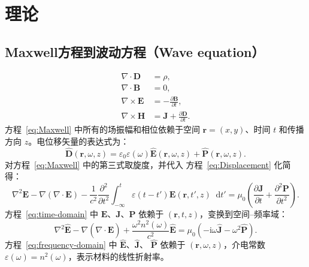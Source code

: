 \documentclass[a4paper,12pt]{ctexart}
\numberwithin{equation}{section}
\newcommand{\vect}[1]{\bm{#1}}
\newcommand{\dd}{\mathop{}\!\mathrm{d}}
\begin{document}
\section{理论}

\subsection{Maxwell方程到波动方程（Wave equation）}
\begin{equation}
  \begin{aligned}
    \nabla\cdot\vect{D}  & = \rho,                                         \\
    \nabla\cdot\vect{B}  & = 0,                                            \\
    \nabla\times\vect{E} & = -\frac{\partial\vect{B}}{\partial t},         \\
    \nabla\times\vect{H} & = \vect{J}+\frac{\partial\vect{D}}{\partial t}.
  \end{aligned}
  \label{eq:Maxwell}
\end{equation}
方程~\eqref{eq:Maxwell} 中所有的场振幅和相位依赖于空间
$\vect{r}=(x,y)$、时间 $t$ 和传播方向 $z$。电位移矢量的表达式为：
\begin{equation}
  \hat{\vect{D}}(\vect{r},\omega,z)
  =\varepsilon_0\varepsilon(\omega)\hat{\vect{E}}(\vect{r},\omega,z)
  +\hat{\vect{P}}(\vect{r},\omega,z).
  \label{eq:Displacement}
\end{equation}
对方程~\eqref{eq:Maxwell} 中的第三式取旋度，并代入
方程~\eqref{eq:Displacement} 化简得：
\begin{equation}
  \nabla^2\vect{E}-\nabla(\nabla\cdot\vect{E})
  -\frac{1}{c^2}\frac{\partial^2}{\partial t^2}
  \int_{-\infty}^{t}\varepsilon(t-t')\vect{E}(\vect{r},t',z)\dd t'
  =\mu_0\left(\frac{\partial\vect{J}}{\partial t}
  +\frac{\partial^2\vect{P}}{\partial t^2}\right).
  \label{eq:time-domain}
\end{equation}
方程~\eqref{eq:time-domain} 中 $\vect{E}$、$\vect{J}$、$\vect{P}$
依赖于 $(\vect{r},t,z)$，变换到空间--频率域：
\begin{equation}
  \nabla^2\hat{\vect{E}}-\nabla(\nabla\cdot\hat{\vect{E}})
  +\frac{\omega^2n^2(\omega)}{c^2}\hat{\vect{E}}
  =\mu_0\left(-\mathrm{i}\omega\hat{\vect{J}}-\omega^2\hat{\vect{P}}\right).
  \label{eq:frequency-domain}
\end{equation}
方程~\eqref{eq:frequency-domain} 中 $\hat{\vect{E}}$、$\hat{\vect{J}}$、
$\hat{\vect{P}}$ 依赖于 $(\vect{r},\omega,z)$，介电常数
$\varepsilon(\omega)=n^2(\omega)$，表示材料的线性折射率。
\end{document}
